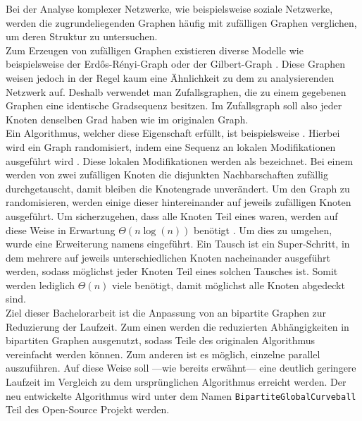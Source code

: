 Bei der Analyse komplexer Netzwerke, wie beispielsweise soziale Netzwerke, 
werden die zugrundeliegenden Graphen häufig mit zufälligen Graphen verglichen, 
um deren Struktur zu untersuchen\cite{DBLP:conf/esa/CarstensH0PTW18}.
\\

Zum Erzeugen von zufälligen Graphen existieren diverse Modelle wie 
beispielsweise der Erd\H{o}s-R\'enyi-Graph \cite{erdos}
oder der Gilbert-Graph \cite{gilbert}.
Diese Graphen
weisen jedoch in der Regel kaum eine Ähnlichkeit zu dem zu analysierenden Netzwerk auf.
Deshalb verwendet man Zufallsgraphen, die zu einem gegebenen Graphen eine identische Gradsequenz
besitzen. Im Zufallsgraph soll also jeder Knoten denselben Grad haben wie im originalen Graph.
\\

Ein Algorithmus, welcher diese Eigenschaft erfüllt, ist beispielsweise \cb{} \cite{curveball}.
Hierbei wird ein Graph randomisiert, indem eine Sequenz an lokalen Modifikationen ausgeführt wird \cite{penschuck2020recent}.
Diese lokalen Modifikationen werden als \ct{} bezeichnet. Bei einem \ct{} werden von zwei zufälligen 
Knoten die disjunkten Nachbarschaften zufällig durchgetauscht, damit bleiben die Knotengrade unverändert.
Um den Graph zu randomisieren, werden einige dieser  hintereinander auf jeweils zufälligen Knoten ausgeführt.
Um sicherzugehen, dass alle Knoten Teil eines  waren, werden auf diese Weise
in Erwartung $\Theta(n\log(n))$   benötigt \cite{DBLP:conf/esa/CarstensH0PTW18}.
Um dies zu umgehen, wurde eine Erweiterung namens \gc{} \cite{DBLP:conf/esa/CarstensH0PTW18} eingeführt. 
Ein \gc{} Tausch ist ein \glqq Super-Schritt\grqq \cite{penschuck2020recent}, in dem mehrere  auf jeweils
unterschiedlichen Knoten nacheinander ausgeführt werden, sodass möglichst jeder Knoten Teil eines solchen Tausches ist. 
Somit werden lediglich $\Theta(n)$ viele  benötigt, %
damit möglichst alle Knoten abgedeckt sind.
\\

Ziel dieser Bachelorarbeit ist die Anpassung von \gc{} an bipartite Graphen zur 
Reduzierung der Laufzeit. 
Zum einen werden die reduzierten Abhängigkeiten in
 bipartiten Graphen ausgenutzt, sodass Teile des originalen \gc{} Algorithmus
vereinfacht werden können. Zum anderen ist es möglich, einzelne  parallel auszuführen.
Auf diese Weise soll ---wie bereits erwähnt--- eine deutlich geringere Laufzeit im Vergleich zu dem ursprünglichen \gc{}
Algorithmus erreicht werden.
Der neu entwickelte Algorithmus wird unter dem Namen \texttt{BipartiteGlobalCurveball} 
Teil des Open-Source Projekt \nk{} werden.
\\

